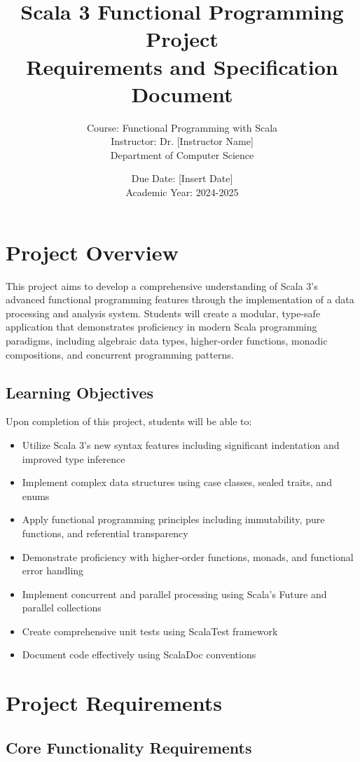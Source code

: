 \documentclass[11pt,a4paper]{article}
\title{\textbf{Scala 3 Functional Programming Project}\\
\large Requirements and Specification Document}
\author{Course: Functional Programming with Scala\\
Instructor: Dr. [Instructor Name]\\
Department of Computer Science}
\date{Due Date: [Insert Date]\\
Academic Year: 2024-2025}
\begin{document}
\maketitle

\section{Project Overview}

This project aims to develop a comprehensive understanding of Scala 3's advanced functional programming features through the implementation of a data processing and analysis system. Students will create a modular, type-safe application that demonstrates proficiency in modern Scala programming paradigms, including algebraic data types, higher-order functions, monadic compositions, and concurrent programming patterns.

\subsection{Learning Objectives}

Upon completion of this project, students will be able to:
\begin{itemize}
    \item Utilize Scala 3's new syntax features including significant indentation and improved type inference
    \item Implement complex data structures using case classes, sealed traits, and enums
    \item Apply functional programming principles including immutability, pure functions, and referential transparency
    \item Demonstrate proficiency with higher-order functions, monads, and functional error handling
    \item Implement concurrent and parallel processing using Scala's Future and parallel collections
    \item Create comprehensive unit tests using ScalaTest framework
    \item Document code effectively using ScalaDoc conventions
\end{itemize}

\section{Project Requirements}

\subsection{Core Functionality Requirements}
\end{document}
